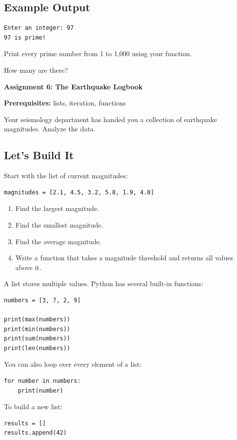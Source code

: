 \documentclass[11pt,letterpaper]{article}
\newcommand{\assignment}[3]{
    \clearpage
    {\Large\bfseries\color{navy} Assignment #1: #2}

    \vspace{2mm}
    {\small\color{darkgray}\textbf{Prerequisites:} #3}

    \vspace{3mm}
}
\newcommand{\steps}{\subsection*{Let's Build It}}
\newcommand{\exampleoutput}{\subsection*{Example Output}}
\begin{document}
\exampleoutput

\begin{lstlisting}[style=outputstyle]
Enter an integer: 97
97 is prime!
\end{lstlisting}

\begin{challengebox}
Print every prime number from 1 to 1,000
using your function.

How many are there?
\end{challengebox}

\assignment{6}{The Earthquake Logbook}
{lists, iteration, functions}

\begin{missionbox}
Your seismology department has handed you a collection of earthquake magnitudes. Analyze the data.
\end{missionbox}

\steps

Start with the list of current magnitudes:

\begin{lstlisting}
magnitudes = [2.1, 4.5, 3.2, 5.8, 1.9, 4.0]
\end{lstlisting}

\begin{enumerate}
    \item Find the largest magnitude.
    \item Find the smallest magnitude.
    \item Find the average magnitude.
    \item Write a function that takes a magnitude threshold and returns all values above it.
\end{enumerate}

\begin{hintbox}
A list stores multiple values. Python has several built-in functions:

\begin{lstlisting}
numbers = [3, 7, 2, 9]

print(max(numbers))
print(min(numbers))
print(sum(numbers))
print(len(numbers))
\end{lstlisting}

You can also loop over every element of a list:

\begin{lstlisting}
for number in numbers:
    print(number)
\end{lstlisting}

To build a new list:

\begin{lstlisting}
results = []
results.append(42)
\end{lstlisting}
\end{hintbox}
\end{document}
